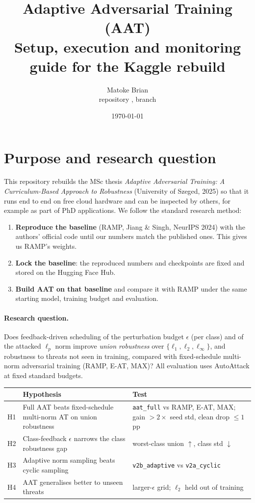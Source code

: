 \documentclass[11pt,a4paper]{article}
\title{\textbf{Adaptive Adversarial Training (AAT)}\\[4pt]
\large Setup, execution and monitoring guide for the Kaggle rebuild}
\author{Matoke Brian\\\small repository \href{https://github.com/mattobryan/AAT}{\code{github.com/mattobryan/AAT}}, branch \code{matt/funny-planck-3j7md5}}
\date{\today}
\newcommand{\code}[1]{\texttt{\small #1}}
\begin{document}
\maketitle
\tableofcontents
\bigskip

\section{Purpose and research question}

This repository rebuilds the MSc thesis \emph{Adaptive Adversarial Training: A Curriculum-Based
Approach to Robustness} (University of Szeged, 2025) so that it runs end to end on free cloud hardware
and can be inspected by others, for example as part of PhD applications. We follow the standard
research method:
\begin{enumerate}
  \item \textbf{Reproduce the baseline} (RAMP, Jiang \& Singh, NeurIPS 2024) with the authors' official
        code until our numbers match the published ones. This gives us RAMP's weights.
  \item \textbf{Lock the baseline}: the reproduced numbers and checkpoints are fixed and stored on the
        Hugging Face Hub.
  \item \textbf{Build AAT on that baseline} and compare it with RAMP under the same starting model,
        training budget and evaluation.
\end{enumerate}

\paragraph{Research question.} Does feedback-driven scheduling of the perturbation budget $\epsilon$
(per class) and of the attacked $\ell_p$ norm improve \emph{union robustness} over
$\{\ell_1,\ell_2,\ell_\infty\}$, and robustness to threats not seen in training, compared with
fixed-schedule multi-norm adversarial training (RAMP, E-AT, MAX)? All evaluation uses AutoAttack at
fixed standard budgets.

\begin{table}[h]
\centering\small
\begin{tabularx}{\linewidth}{@{}lXX@{}}
\toprule
 & Hypothesis & Test \\
\midrule
H1 & Full AAT beats fixed-schedule multi-norm AT on union robustness & \code{aat\_full} vs RAMP, E-AT, MAX; gain $>2\times$ seed std, clean drop $\le 1$\,pp \\
H2 & Class-feedback $\epsilon$ narrows the class robustness gap & worst-class union $\uparrow$, class std $\downarrow$ \\
H3 & Adaptive norm sampling beats cyclic sampling & \code{v2b\_adaptive} vs \code{v2a\_cyclic} \\
H4 & AAT generalises better to unseen threats & larger-$\epsilon$ grid; $\ell_2$ held out of training \\
\bottomrule
\end{tabularx}
\end{table}
\end{document}
